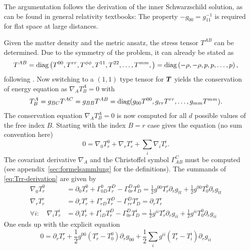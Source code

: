 \documentclass[12pt,a4paper]{report}
\numberwithin{equation}{chapter}
\begin{document}
The argumentation follows the derivation of the inner Schwarzschild solution, as can be found in general relativity textbooks: The property $-g_{00} = g_{11}^{-1}$ is required for flat space at large distances.

Given the matter density and the metric ansatz, the stress tensor $T^{AB}$ can be determined. Due to the symmetry of the problem, it can already be stated as
\begin{equation}\label{eq:T-Ansatz}
T^{AB}
= \operatorname{diag}\left(
T^{00}, T^{rr},
T^{\phi\phi},
T^{11},
T^{22},
\dots,
T^{mm},
\right)
= \operatorname{diag}\left(
-\rho, -\rho, p, p, \dots, p
\right),
\end{equation}
following \cite{Rizzo, NSS2006}. Now switching to a $(1,1)$ type tensor for $\boldsymbol{ T }$ yields the conservation of energy equation as $\nabla_A T^A_B=0$ with
\begin{equation}
T^A_B = g_{BC} T^{AC}
= g_{BB} T^{AB}
= \operatorname{diag}(g_{00} T^{00}, g_{rr} T^{rr}, \dots, g_{mm} T^{mm}).
\end{equation}
The conservation equation $\nabla_A T^A_B=0$ is now computed for all $d$ possible values of the free index $B$. Starting with the index $B=r$ case gives the equation (no sum convention here)
\begin{equation}\label{eq:Trr-derivation}
0 = \nabla_0 T^0_r + \nabla_r T^r_r
+ \sum_i \nabla_i T^i_r.
\end{equation}
The covariant derivative $\nabla_A$ and the Christoffel symbol $\Gamma_{AB}^C$  must be computed (see appendix~\ref{sec:formelsammlung} for the definitions). The summands of \eqref{eq:Trr-derivation} are given by
\begin{subequations}
\begin{align}
\nabla_0 T^0_r &=
\partial_0 T^0_r
+ \Gamma^0_{0D} T^D_r
- \Gamma^D_{0r} T^0_D
=
\frac 12 g^{00} T^r_r \partial_r g_{tt} +
\frac 12 g^{00} T^0_0 \partial_r g_{tt}
\\
\nabla_r T^r_r &=
\partial_r T^r_r
+ \Gamma^r_{r D} T^D_r
- \Gamma^D_{r r} T^r_D
= \partial_r T^r_r
\\
\forall i:\quad
\nabla_i T^i_r &=
\partial_i T^i_r
+ \Gamma^i_{i D} T^D_r
- \Gamma^D_{0 r} T^i_D
=
\frac 12 g^{ii} T^r_r \partial_r g_{ii} +
\frac 12 g^{ii} T^0_0 \partial_r g_{ii}
\end{align}
\end{subequations}
One ends up with the explicit equation %
\begin{equation}
0 = \partial_r T^r_r
+ \frac 12
g^{00} \left( T^r_r - T^0_0 \right) \partial_r g_{00}
+
\frac 12
\sum_i
g^{ii} \left( T^r_r - T^i_i \right) \partial_r g_{ii}
\end{equation}
\end{document}
